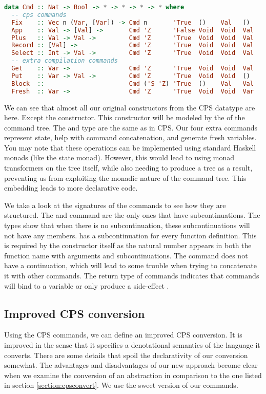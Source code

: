 \begin{lstlisting}[language=Haskell]
data Cmd :: Nat -> Bool -> * -> * -> * -> * where
  -- cps commands
  Fix    :: Vec n (Var, [Var]) -> Cmd n       'True  ()    Val   ()
  App    :: Val -> [Val] ->       Cmd 'Z      'False Void  Void  Val 
  Plus   :: Val -> Val ->         Cmd 'Z      'True  Void  Void  Val
  Record :: [Val] ->              Cmd 'Z      'True  Void  Void  Val
  Select :: Int -> Val ->         Cmd 'Z      'True  Void  Void  Val
  -- extra compilation commands
  Get    :: Var ->                Cmd 'Z      'True  Void  Void  Val
  Put    :: Var -> Val ->         Cmd 'Z      'True  Void  Void  ()
  Block  ::                       Cmd ('S 'Z) 'True  ()    Val   Val
  Fresh  :: Var ->                Cmd 'Z      'True  Void  Void  Var
\end{lstlisting}

We can see that almost all our original constructors from the \ac{CPS} datatype are here. Except the  constructor. This constructor will be modeled by the  of the command tree. The  and  type are the same as in \ac{CPS}. Our four extra commands represent state, help with command concatenation, and generate fresh variables. You may note that these operations can be implemented using standard Haskell monads (like the state monad). However, this would lead to using monad transformers on the tree itself, while also needing to produce a tree as a result, preventing us from exploiting the monadic nature of the command tree. This embedding leads to more declarative code.

We take a look at the signatures of the commands to see how they are structured. The  and  command are the only ones that have subcontinuations. The  types show that when there is no subcontinuation, these subcontinuations will not have any members.  has a subcontinuation for every function definition. This is required by the constructor itself as the natural number  appears in both the function name with arguments and subcontinuations. The  command does not have a continuation, which will lead to some trouble when trying to concatenate it with other commands. The return type of commands indicates that commands will bind to a variable  or only produce a side-effect \lstinlineb{()}.

\subsection{\label{section:impcpsconvert}Improved CPS conversion}
Using the \ac{CPS} commands, we can define an improved \ac{CPS} conversion. It is improved in the sense that it specifies a denotational semantics\autocite{DBLP:conf/tacs/CartwrightF94} of the language it converts. There are some details that spoil the declarativity of our conversion somewhat. The advantages and disadvantages of our new approach become clear when we examine the conversion of an abstraction in comparison to the one listed in section \ref{section:cpsconvert}. We use the sweet version of our commands.

